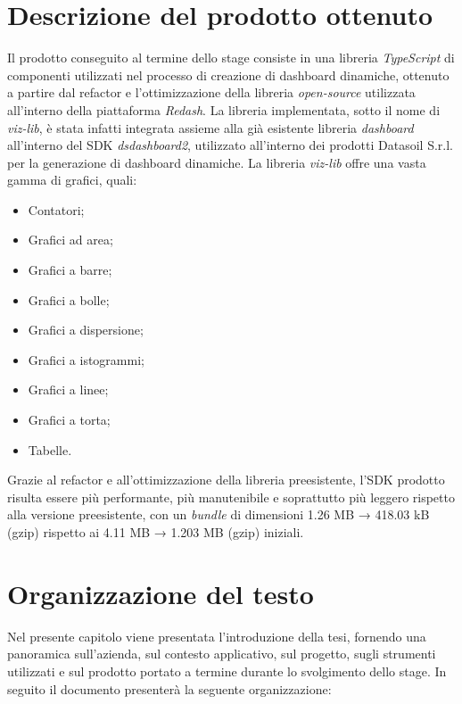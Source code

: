 \section{Descrizione del prodotto ottenuto}
Il prodotto conseguito al termine dello stage consiste in una libreria \textit{TypeScript} di componenti utilizzati nel processo di creazione di dashboard dinamiche,
ottenuto a partire dal refactor e l'ottimizzazione della libreria \textit{open-source} utilizzata all'interno della piattaforma \textit{Redash}.
La libreria implementata, sotto il nome di \textit{viz-lib}, è stata infatti integrata assieme alla già esistente libreria \textit{dashboard} all'interno del SDK
\textit{dsdashboard2}, utilizzato all'interno dei prodotti Datasoil S.r.l. per la generazione di dashboard dinamiche.
La libreria \textit{viz-lib} offre una vasta gamma di grafici, quali:
\begin{itemize}
      \item Contatori;
      \item Grafici ad area;
      \item Grafici a barre;
      \item Grafici a bolle;
      \item Grafici a dispersione;
      \item Grafici a istogrammi;
      \item Grafici a linee;
      \item Grafici a torta;
      \item Tabelle.
\end{itemize}
Grazie al refactor e all'ottimizzazione della libreria preesistente, l'SDK prodotto risulta essere più performante, più manutenibile e soprattutto più leggero rispetto
alla versione preesistente, con un \textit{bundle} di dimensioni 1.26 MB → 418.03 kB (gzip) rispetto ai 4.11 MB → 1.203 MB (gzip) iniziali.

\section{Organizzazione del testo}
Nel presente capitolo viene presentata l'introduzione della tesi, fornendo una panoramica sull'azienda, sul contesto applicativo,
sul progetto, sugli strumenti utilizzati e sul prodotto portato a termine durante lo svolgimento dello stage. \newline
In seguito il documento presenterà la seguente organizzazione:

